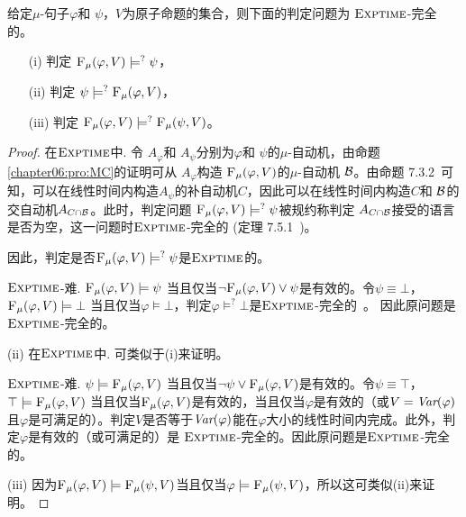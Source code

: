 \begin{theorem}[Entailment]
	\label{thm:Ent}
	给定$\mu$-句子$\varphi$和 $\psi$，$V$为原子命题的集合，则下面的判定问题为 $\textsc{Exptime}$-完全的。
	\begin{itemize}
		\item[(i)] 判定  ${\textsc{F}_{\textsc{$\mu$}}}(\varphi, V ) \models^? \psi$，
		\item[(ii)] 判定  $\psi \models^? {\textsc{F}_{\textsc{$\mu$}}}(\varphi, V)$，
		\item[(iii)] 判定 ${\textsc{F}_{\textsc{$\mu$}}}(\varphi, V) \models^? {\textsc{F}_{\textsc{$\mu$}}}(\psi, V)$。
	\end{itemize}
\end{theorem}
\begin{proof}	
	在$\textsc{Exptime}$中. 令 $A_{\varphi}$和 $A_{\psi}$分别为$\varphi$和 $\psi$的$\mu$-自动机，由命题\ref{chapter06:pro:MC}的证明可从 $A_{\varphi}$构造 ${\textsc{F}_{\textsc{$\mu$}}}(\varphi, V )$的$\mu$-自动机 ${\cal B}$。由命题 7.3.2~\cite{comon1997tree}可知，可以在线性时间内构造$A_\psi$的补自动机$C$，因此可以在线性时间内构造$C$和 ${\cal B}$的交自动机$A_{C \cap {\cal B}}$。此时，判定问题 ${\textsc{F}_{\textsc{$\mu$}}}(\varphi, V ) \models^? \psi$被规约称判定 $A_{C \cap {\cal B}}$接受的语言是否为空，这一问题时$\textsc{Exptime}$-完全的 (定理 7.5.1~\cite{comon1997tree})。
	
	因此，判定是否${\textsc{F}_{\textsc{$\mu$}}}(\varphi, V ) \models^? \psi$是$\textsc{Exptime}$的。 
	
	$\textsc{Exptime}$-难. ${\textsc{F}_{\textsc{$\mu$}}}(\varphi, V ) \models \psi$ 当且仅当$\neg {\textsc{F}_{\textsc{$\mu$}}}(\varphi, V) \vee \psi$是有效的。令$\psi \equiv \bot$， ${\textsc{F}_{\textsc{$\mu$}}}(\varphi, V ) \models \bot$ 当且仅当$\varphi \models \bot$，判定$\varphi \models^? \bot$是$\textsc{Exptime}$-完全的~\cite{bradfield2018mu}。
	因此原问题是$\textsc{Exptime}$-完全的。
	
	
	(ii) 在$\textsc{Exptime}$中. 可类似于(i)来证明。 
	
	$\textsc{Exptime}$-难.   $\psi \models {\textsc{F}_{\textsc{$\mu$}}}(\varphi, V)$  当且仅当$\neg \psi \vee {\textsc{F}_{\textsc{$\mu$}}}(\varphi, V)$是有效的。令$\psi \equiv \top$，$\top \models {\textsc{F}_{\textsc{$\mu$}}}(\varphi, V)$ 当且仅当${\textsc{F}_{\textsc{$\mu$}}}(\varphi,V)$是有效的，当且仅当$\varphi$是有效的（或$V =\textit{Var}(\varphi)$且$\varphi$是可满足的）。判定$V$是否等于$\textit{Var}(\varphi)$能在$\varphi$大小的线性时间内完成。此外，判定$\varphi$是有效的（或可满足的）是 $\textsc{Exptime}$-完全的。因此原问题是$\textsc{Exptime}$-完全的。 
	
	(iii) 因为${\textsc{F}_{\textsc{$\mu$}}}(\varphi, V) \models {\textsc{F}_{\textsc{$\mu$}}}(\psi, V)$当且仅当$\varphi \models {\textsc{F}_{\textsc{$\mu$}}}(\psi, V)$，所以这可类似(ii)来证明。
\end{proof}


